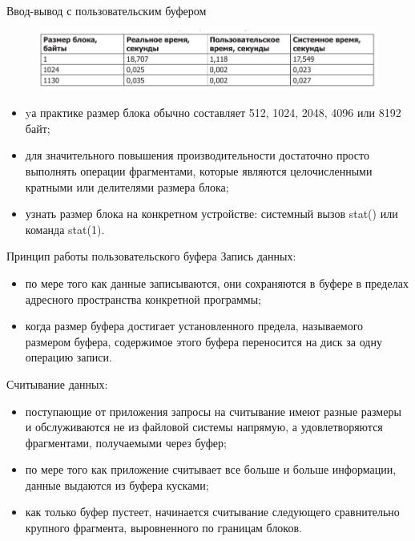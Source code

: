 \documentclass{beamer}
\begin{document}
\begin{frame}{Ввод-вывод с пользовательским буфером}
\begin{figure}[h]
\centering
\includegraphics[scale=0.5]{images/lec05-pic03.png}
\end{figure}
\begin{itemize}
\item yа практике размер блока обычно составляет 512, 1024, 2048, 4096 или 8192 байт;
\item для значительного повышения производительности достаточно просто выполнять операции фрагментами, которые являются целочисленными кратными или делителями размера блока;
\item узнать размер блока на конкретном устройстве: системный вызов stat() или  команда stat(1).  
\end{itemize}
\end{frame}

\begin{frame}{Принцип работы пользовательского буфера}
Запись данных:
\begin{itemize}
\item по мере того как данные записываются, они сохраняются в буфере в пределах адресного пространства конкретной программы;
\item когда размер буфера достигает установленного предела, называемого размером буфера, содержимое этого буфера переносится на диск за одну операцию записи. 
\end{itemize}
Считывание данных:
\begin{itemize}
\item поступающие от приложения запросы на считывание имеют разные размеры и обслуживаются не из файловой системы напрямую, а удовлетворяются фрагментами,
получаемыми через буфер;
\item по мере того как приложение считывает все больше и больше информации, данные выдаются из буфера кусками;
\item как только буфер пустеет, начинается считывание следующего сравнительно крупного фрагмента, выровненного по границам блоков. 
\end{itemize}
\end{frame}
\end{document}
